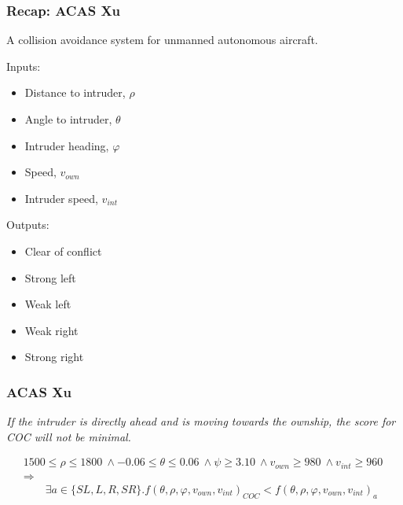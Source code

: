 \documentclass[t,compress,aspectratio=169]{beamer}
\begin{document}
\begin{frame}
\frametitle{Recap: ACAS Xu}

\vspace{-1em}

A collision avoidance system for unmanned autonomous aircraft.


\vspace{-1em}

Inputs:
\begin{itemize}
\setlength\itemsep{-0.1em}
\item Distance to intruder, $\rho$
\item Angle to intruder, $\theta$
\item Intruder heading, $\varphi$
\item Speed, $v_{own}$
\item Intruder speed, $v_{int}$
\end{itemize}

Outputs:
\begin{itemize}
\setlength\itemsep{-0.1em}
\item Clear of conflict
\item Strong left
\item Weak left
\item Weak right
\item Strong right
\end{itemize}

\end{frame}


\begin{frame}
\frametitle{ACAS Xu}

\begin{definition}
{\it If the intruder is directly ahead and is moving towards the
 ownship, the score for COC will not be minimal.}
\end{definition}

\begin{equation*}
\begin{array}{c}
1500 \leq \rho \leq 1800 \ \wedge -0.06 \leq \theta \leq 0.06 \ \wedge \psi \geq 3.10 \ \wedge 
  v_{own} \geq 980 \ \wedge v_{int} \geq 960 \
  \\
  \Rightarrow \\
\qquad
\exists a \in \{SL,L,R,SR\}. f(\theta, \rho, \varphi, v_{own}, v_{int})_{COC} < f(\theta, \rho, \varphi, v_{own}, v_{int})_a
\end{array}
\end{equation*}

\end{frame}
\end{document}
